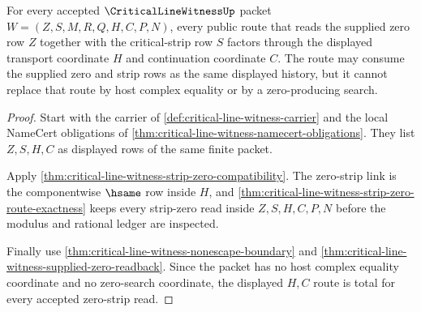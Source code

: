 \begin{theorem}
\label{thm:critical-line-witness-zero-strip-route-totality}
For every accepted $\CriticalLineWitnessUp$ packet $W=(Z,S,M,R,Q,H,C,P,N)$, every public route that reads the supplied zero row $Z$ together with the critical-strip row $S$ factors through the displayed transport coordinate $H$ and continuation coordinate $C$. The route may consume the supplied zero and strip rows as the same displayed history, but it cannot replace that route by host complex equality or by a zero-producing search.
\end{theorem}
\begin{proof}
Start with the carrier of \autoref{def:critical-line-witness-carrier} and the local NameCert obligations of \autoref{thm:critical-line-witness-namecert-obligations}. They list $Z,S,H,C$ as displayed rows of the same finite packet.

Apply \autoref{thm:critical-line-witness-strip-zero-compatibility}. The zero-strip link is the componentwise $\hsame$ row inside $H$, and \autoref{thm:critical-line-witness-strip-zero-route-exactness} keeps every strip-zero read inside $Z,S,H,C,P,N$ before the modulus and rational ledger are inspected.

Finally use \autoref{thm:critical-line-witness-nonescape-boundary} and \autoref{thm:critical-line-witness-supplied-zero-readback}. Since the packet has no host complex equality coordinate and no zero-search coordinate, the displayed $H,C$ route is total for every accepted zero-strip read.
\end{proof}

